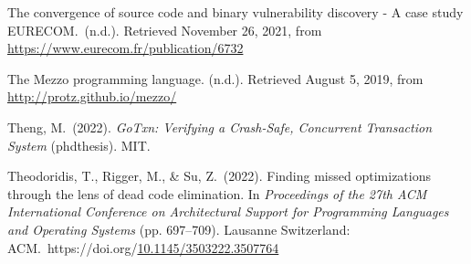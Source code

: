 \documentclass[12pt,twoside]{article}
\begin{document}
{\begin{thebibliography}{1079}
\mdbibitemlabel{}The convergence of source code and binary vulnerability discovery - A case study \textbar{} EURECOM.~(n.d.). Retrieved November 26, 2021, from \href{https://www.eurecom.fr/publication/6732}{{\ttfamily https://\hspace{0pt}www.\hspace{0pt}eurecom.\hspace{0pt}fr/\hspace{0pt}publication/\hspace{0pt}6732}}%

\mdbibitemlabel{}The Mezzo programming language. (n.d.). Retrieved August 5, 2019, from \href{http://protz.github.io/mezzo/}{{\ttfamily http://\hspace{0pt}protz.\hspace{0pt}github.\hspace{0pt}io/\hspace{0pt}mezzo/\hspace{0pt}}}%

\mdbibitemlabel{}Theng, M.~(2022). \emph{GoTxn: Verifying a Crash-Safe, Concurrent Transaction System} (phdthesis). MIT.%

\mdbibitemlabel{}Theodoridis, T., Rigger, M., \& Su, Z.~(2022). Finding missed optimizations through the lens of dead code elimination. In \emph{Proceedings of the 27th ACM International Conference on Architectural Support for Programming Languages and Operating Systems} (pp. 697–709). Lausanne Switzerland: ACM.~https://doi.org/\href{https://dx.doi.org/10.1145/3503222.3507764}{10.1145/3503222.3507764}%


\end{thebibliography}}
\end{document}
